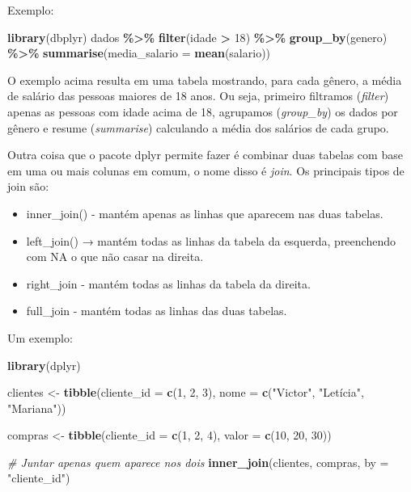 \documentclass[
]{book}
\newenvironment{Shaded}{\begin{snugshade}}{\end{snugshade}}
\newcommand{\AttributeTok}[1]{\textcolor[rgb]{0.13,0.29,0.53}{#1}}
\newcommand{\CommentTok}[1]{\textcolor[rgb]{0.56,0.35,0.01}{\textit{#1}}}
\newcommand{\DecValTok}[1]{\textcolor[rgb]{0.00,0.00,0.81}{#1}}
\newcommand{\FunctionTok}[1]{\textcolor[rgb]{0.13,0.29,0.53}{\textbf{#1}}}
\newcommand{\NormalTok}[1]{#1}
\newcommand{\OtherTok}[1]{\textcolor[rgb]{0.56,0.35,0.01}{#1}}
\newcommand{\SpecialCharTok}[1]{\textcolor[rgb]{0.81,0.36,0.00}{\textbf{#1}}}
\newcommand{\StringTok}[1]{\textcolor[rgb]{0.31,0.60,0.02}{#1}}
\providecommand{\tightlist}{%
  \setlength{\itemsep}{0pt}\setlength{\parskip}{0pt}}
\begin{document}
Exemplo:

\begin{Shaded}
\begin{Highlighting}[]
\FunctionTok{library}\NormalTok{(dbplyr)}
\NormalTok{dados }\SpecialCharTok{\%\textgreater{}\%} 
  \FunctionTok{filter}\NormalTok{(idade }\SpecialCharTok{\textgreater{}} \DecValTok{18}\NormalTok{) }\SpecialCharTok{\%\textgreater{}\%} 
  \FunctionTok{group\_by}\NormalTok{(genero) }\SpecialCharTok{\%\textgreater{}\%} 
  \FunctionTok{summarise}\NormalTok{(}\AttributeTok{media\_salario =} \FunctionTok{mean}\NormalTok{(salario))}
\end{Highlighting}
\end{Shaded}

O exemplo acima resulta em uma tabela mostrando, para cada gênero, a média de salário das pessoas maiores de 18 anos. Ou seja, primeiro filtramos (\emph{filter}) apenas as pessoas com idade acima de 18, agrupamos (\emph{group\_by}) os dados por gênero e resume (\emph{summarise}) calculando a média dos salários de cada grupo.

Outra coisa que o pacote dplyr permite fazer é combinar duas tabelas com base em uma ou mais colunas em comum, o nome disso é \emph{join}. Os principais tipos de join são:

\begin{itemize}
\tightlist
\item
  inner\_join() - mantém apenas as linhas que aparecem nas duas tabelas.
\item
  left\_join() → mantém todas as linhas da tabela da esquerda, preenchendo com NA o que não casar na direita.
\item
  right\_join - mantém todas as linhas da tabela da direita.
\item
  full\_join - mantém todas as linhas das duas tabelas.
\end{itemize}

Um exemplo:

\begin{Shaded}
\begin{Highlighting}[]
\FunctionTok{library}\NormalTok{(dplyr)}

\NormalTok{clientes }\OtherTok{\textless{}{-}} \FunctionTok{tibble}\NormalTok{(}\AttributeTok{cliente\_id =} \FunctionTok{c}\NormalTok{(}\DecValTok{1}\NormalTok{, }\DecValTok{2}\NormalTok{, }\DecValTok{3}\NormalTok{),}
                   \AttributeTok{nome =} \FunctionTok{c}\NormalTok{(}\StringTok{"Victor"}\NormalTok{, }\StringTok{"Letícia"}\NormalTok{, }\StringTok{"Mariana"}\NormalTok{))}

\NormalTok{compras }\OtherTok{\textless{}{-}} \FunctionTok{tibble}\NormalTok{(}\AttributeTok{cliente\_id =} \FunctionTok{c}\NormalTok{(}\DecValTok{1}\NormalTok{, }\DecValTok{2}\NormalTok{, }\DecValTok{4}\NormalTok{),}
                  \AttributeTok{valor =} \FunctionTok{c}\NormalTok{(}\DecValTok{10}\NormalTok{, }\DecValTok{20}\NormalTok{, }\DecValTok{30}\NormalTok{))}

\CommentTok{\# Juntar apenas quem aparece nos dois}
\FunctionTok{inner\_join}\NormalTok{(clientes, compras, }\AttributeTok{by =} \StringTok{"cliente\_id"}\NormalTok{)}
\end{Highlighting}
\end{Shaded}
\end{document}
